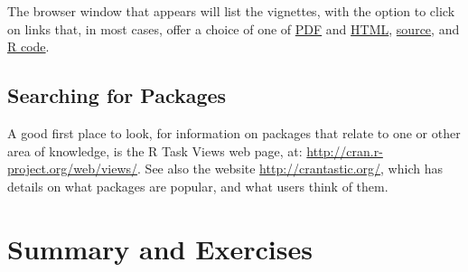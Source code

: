 The browser window that appears will list the vignettes, with the
option to click on links that, in most cases, offer a choice of
one of \underline{PDF} and \underline{HTML}, \underline{source},
and \underline{R code}.

\subsection*{Searching for Packages}

A good first place to look, for information on packages that relate to
one or other area of knowledge, is the R Task Views web page, at:
\url{http://cran.r-project.org/web/views/}. See also the website
\url{http://crantastic.org/}, which has details on what packages are
popular, and what users think of them.


\section{Summary and Exercises}

